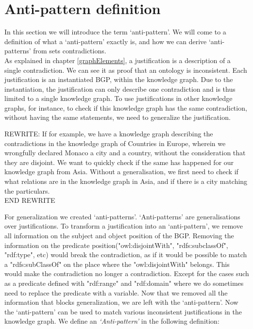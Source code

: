 \documentclass[11pt,letterpaper ,oneside ]{book}
\begin{document}
	\section{Anti-pattern definition}\label{AntiPatternDefinition}
	In this section we will introduce the term `anti-pattern'. We will come to a definition of what a `anti-pattern' exactly is, and how we can derive `anti-patterns' from sets contradictions. \\
	
	As explained in chapter \ref{graphElements}, a justification is a description of a single contradiction. We can see it as proof that an ontology is inconsistent. Each justification is an instantiated BGP, within the knowledge graph. Due to the instantiation, the justification can only describe one contradiction and is thus limited to a single knowledge graph. To use justifications in other knowledge graphs, for instance, to check if this knowledge graph has the same contradiction, without having the same statements, we need to generalize the justification.
	
	REWRITE:
	If for example, we have a knowledge graph describing the contradictions in the knowledge graph of Countries in Europe, wherein we wrongfully declared Monaco a city and a country, without the consideration that they are disjoint. We want to quickly check if the same has happened for our knowledge graph from Asia. Without a generalisation, we first need to check if what relations are in the knowledge graph in Asia, and if there is a city matching the particulars.\\
	END REWRITE
	
	For generalization we created `anti-patterns'. `Anti-patterns' are generalisations over justifications. To transform a justification into an `anti-pattern', we remove all information on the subject and object position of the BGP. Removing the information on the predicate position("owl:disjointWith", "rdfs:subclassOf", "rdf:type", etc) would break the contradiction, as if it would be possible to match a "rdfs:subClassOf" on the place where the "owl:disjointWith" belongs. This would make the contradiction no longer a contradiction. Except for the cases such as a predicate defined with "rdf:range" and "rdf:domain" where we do sometimes need to replace the predicate with a variable. 
	Now that we removed all the information that blocks generalization, we are left with the `anti-pattern'. Now the `anti-pattern' can be used to match various inconsistent justifications in the knowledge graph. We define an \textit{`Anti-pattern'} in the following definition:\\
	
\end{document}
